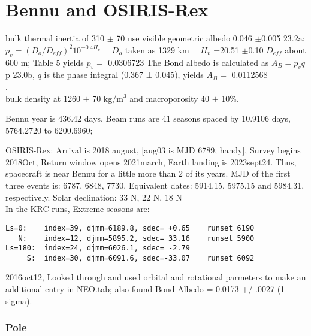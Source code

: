\documentclass{article}
\begin{document}
\section{Bennu and OSIRIS-Rex}  %

\qi bulk thermal inertia of 310 $\pm$ 70 \quti
\qi use visible geometric albedo  0.046  $\pm$0.005
\qii 23.2a: $p_v = ( D_o/ D_{eff})^2 10^{-0.4H_v}$  \ \ $D_o$ taken as 1329 km \ \ $H_v$ =20.51 $\pm$0.10
\qii $ D_{eff}$ about 600 m; Table 5
\qii yields $p_v=$ 0.0306723
\qi The Bond albedo is calculated as $A_B = p_v q$ 
\qii p 23.0b,  $q$ is the phase integral (0.367 ± 0.045),
\qii yields $A_B =$  0.0112568
\\ .
\\ 
\qi bulk density at 1260 $\pm$ 70 kg/m$^3$ and macroporosity 40 $\pm$ 10\%.

Bennu year is 436.42 days.  Beam runs are 41 seasons spaced by 10.9106 days,
5764.2720 to 6200.6960; 

\vspace{2.mm} OSIRIS-Rex: Arrival is 2018 august, [aug03 is MJD 6789, handy],
Survey begins 2018Oct, Return window opens 2021march, Earth landing is
2023sept24. Thus, spacecraft is near Bennu for a little more than 2 of its
years. MJD of the first three events is: 6787, 6848, 7730.
\qi Equivalent dates:  5914.15, 5975.15 and 5984.31, respectively.
\qi Solar declination: 33 N, 22 N, 18 N 
\\ In the KRC runs, Extreme seasons are:
\vspace{-3.mm} 
\begin{verbatim}
Ls=0:    index=39, djmm=6189.8, sdec= +0.65    runset 6190
   N:    index=12, djmm=5895.2, sdec= 33.16    runset 5900
Ls=180:  index=24, djmm=6026.1, sdec= -2.79 
     S:  index=30, djmm=6091.6, sdec=-33.07    runset 6092
\end{verbatim} 

2016oct12, Looked through \qcite{} and used orbital and rotational parmeters to
make an additional entry in NEO.tab; also found Bond Albedo = 0.0173 +/-.0027
(1-sigma).

\subsubsection{Pole}
\end{document}
